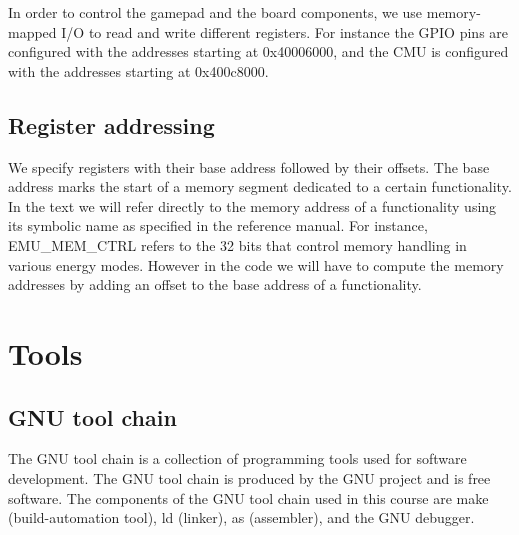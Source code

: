In order to control the gamepad and the board components, we use memory-mapped I/O to read and write different registers. For instance the GPIO pins are configured with the addresses starting at 0x40006000, and the CMU is configured with the addresses starting at 0x400c8000.


\subsection{Register addressing}
We specify registers with their base address followed by their offsets. The base address marks the start of a memory segment dedicated to a certain functionality. In the text we will refer directly to the memory address of a functionality using its symbolic name as specified in the reference manual. For instance, EMU\_MEM\_CTRL refers to the 32 bits that control memory handling in various energy modes. However in the code we will have to compute the memory addresses by adding an offset to the base address of a functionality.



\section{Tools}

\subsection{GNU tool chain}
The GNU tool chain is a collection of programming tools used for software development. The GNU tool chain is produced by the GNU project and is free software. The components of the GNU tool chain used in this course are make (build-automation tool), ld (linker), as (assembler), and the GNU debugger.\cite{gnu.org}


